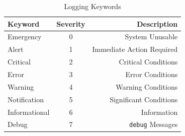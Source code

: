 \documentclass[12pt]{article}
\begin{document}
	\begin{table}[H]
	\centering
	\caption{Logging Keywords \label{tab:LOGGING}}
	\begin{tabular}{@{} l c r @{}}\hline
	\textbf{Keyword} 	& \textbf{Severity}	& \textbf{Description}\\\hline
	Emergency		& 0				& System Unusable\\
	Alert			& 1				& Immediate Action Required\\\hline
	Critical		& 2				& Critical Conditions\\
	Error			& 3				& Error Conditions\\
	Warning		& 4				& Warning Conditions\\\hline
	Notification		& 5				& Significant Conditions\\
	Informational	& 6				& Information\\\hline
	Debug		& 7				& \texttt{debug} Messages\\\hline
	\end{tabular}\end{table}





\end{document}
